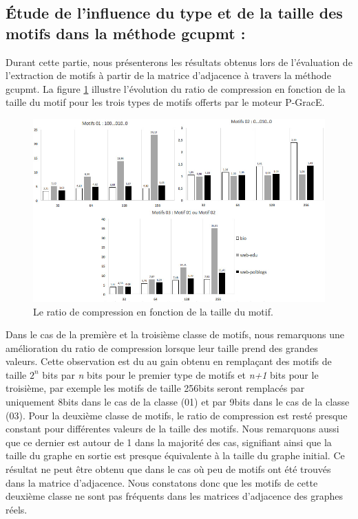 	
	
	\subsection{Étude de l'influence du type et de la taille des motifs dans la méthode \gls{gcupmt} :}
	
	Durant cette partie, nous présenterons les résultats obtenus lors de l'évaluation de l'extraction de motifs à partir de la matrice d'adjacence à travers la méthode \gls{gcupmt}. La figure \ref{fig:test-m} illustre l'évolution du ratio de compression en fonction de la taille du motif pour les trois types de motifs offerts par le moteur P-GracE.
		\begin{figure}[H]
		\begin{center}
		
			\includegraphics[scale=0.55]{ressources/image/m12.jpg}
			
			
			
			\caption{Le ratio de compression en fonction de la taille du motif.}
			\label{fig:test-m}
		\end{center}
	\end{figure}
	
	Dans le cas de la première et la troisième classe de motifs, nous remarquons une amélioration du ratio de compression lorsque leur taille prend des grandes valeurs. Cette observation est du au gain obtenu en remplaçant des motifs de taille $2^n$ bits par \textit{n} bits pour le premier type de motifs et \textit{n+1} bits pour le troisième, par exemple les motifs de taille 256bits seront remplacés par uniquement 8bits dans le cas de la classe (01) et par 9bits dans le cas de la classe (03). Pour la deuxième classe de motifs, le ratio de compression est resté presque constant pour différentes valeurs de la taille des motifs. Nous remarquons aussi que ce dernier est autour de 1 dans la majorité des cas, signifiant ainsi que la taille du graphe en sortie est presque équivalente à la taille du graphe initial. Ce résultat ne peut être obtenu que dans le cas où peu de motifs ont été trouvés dans la matrice d'adjacence. Nous constatons donc que les motifs de cette deuxième classe ne sont pas fréquents dans les matrices d'adjacence des graphes réels. 
	
